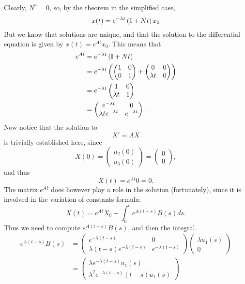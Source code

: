 Clearly, $N^2=0$, so, by the theorem in the simplified case,
\begin{align*}
x(t) &= e^{-\lambda t}\left(\mathbb{I}+Nt\right)x_0 \\
\end{align*}
But we know that solutions are unique, and that the solution to the differential equation is given by $x(t)=e^{At}x_0$. This means that
\begin{align*}
e^{At} &= e^{-\lambda t}\left(\mathbb{I}+Nt\right)\\
&= e^{-\lambda t}\left(\begin{pmatrix}1&0\\0&1\end{pmatrix}+
\begin{pmatrix}
0 & 0 \\
\lambda t & 0
\end{pmatrix}\right)\\
&= e^{-\lambda t}\begin{pmatrix}
1 & 0 \\
\lambda t & 1
\end{pmatrix} \\
&= \begin{pmatrix}
e^{-\lambda t} & 0 \\
\lambda te^{-\lambda t} & e^{-\lambda t}
\end{pmatrix}.
\end{align*}
Now notice that the solution to
\[
X'=AX
\]
is trivially established here, since
\[
X(0)=\begin{pmatrix}u_2(0)\\u_3(0)\end{pmatrix}=\begin{pmatrix}0\\0\end{pmatrix},
\]
and thus
\[
X(t)=e^{At}0=0.
\]
The matrix $e^{At}$ does however play a role in the solution (fortunately), since it is involved in the variation of constants formula:
\[
X(t)=e^{At}X_0+\int_0^t e^{A(t-s)}B(s)ds.
\]
Thus we need to compute $e^{A(t-s)}B(s)$, and then the integral.
\begin{align*}
e^{A(t-s)}B(s) &= 
\begin{pmatrix}
e^{-\lambda (t-s)} & 0 \\
\lambda (t-s)e^{-\lambda (t-s)} & e^{-\lambda (t-s)}
\end{pmatrix}
\begin{pmatrix}
\lambda u_1(s)\\ 0
\end{pmatrix} \\
&= \begin{pmatrix}
\lambda e^{-\lambda(t-s)}u_1(s) \\
\lambda^2e^{-\lambda(t-s)} (t-s)u_1(s)
\end{pmatrix}
\end{align*}
